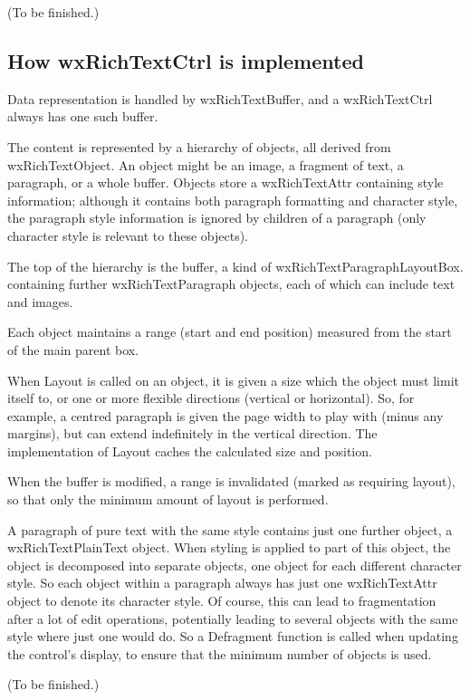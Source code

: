 (To be finished.)

\subsection{How wxRichTextCtrl is implemented}

Data representation is handled by wxRichTextBuffer, and a wxRichTextCtrl
always has one such buffer.

The content is represented by a hierarchy of objects, all derived from
wxRichTextObject. An object might be an image, a fragment of text, a paragraph,
or a whole buffer. Objects store a wxRichTextAttr containing style information;
although it contains both paragraph formatting and character style, the
paragraph style information is ignored by children of a paragraph (only
character style is relevant to these objects).

The top of the hierarchy is the buffer, a kind of wxRichTextParagraphLayoutBox.
containing further wxRichTextParagraph objects, each of which can include text and
images.

Each object maintains a range (start and end position) measured
from the start of the main parent box.

When Layout is called on an object, it is given a size which the object
must limit itself to, or one or more flexible directions (vertical
or horizontal). So, for example, a centred paragraph is given the page
width to play with (minus any margins), but can extend indefinitely
in the vertical direction. The implementation of Layout caches the calculated
size and position.

When the buffer is modified, a range is invalidated (marked as requiring
layout), so that only the minimum amount of layout is performed.

A paragraph of pure text with the same style contains just one further
object, a wxRichTextPlainText object. When styling is applied to part of
this object, the object is decomposed into separate objects, one object
for each different character style. So each object within a paragraph always has
just one wxRichTextAttr object to denote its character style. Of course, this can
lead to fragmentation after a lot of edit operations, potentially leading
to several objects with the same style where just one would do. So
a Defragment function is called when updating the control's display, to ensure that
the minimum number of objects is used.

(To be finished.)

